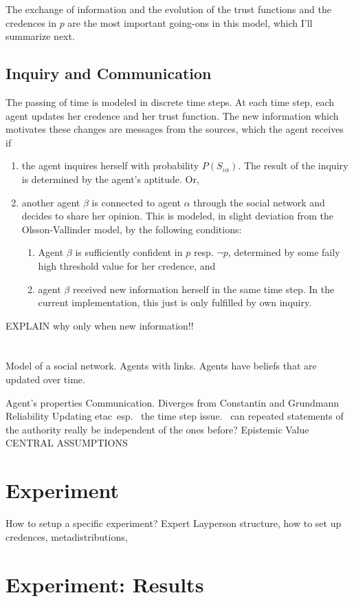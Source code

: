 \documentclass[11pt, a4paper]{article}
\begin{document}
The exchange of information and the evolution of the trust functions and the credences in $p$ are the most important going-ons in this model, which I'll summarize next.

\subsection{Inquiry and Communication} 
The passing of time is modeled in discrete time steps. At each time step, each agent updates her credence and her trust function. The new information which motivates these changes are messages from the sources, which the agent receives if
\begin{enumerate}[label = (\roman*)]
    \item the agent inquires herself with probability $P(S_{\iota\alpha})$. The result of the inquiry is determined by the agent's aptitude. Or,
    \item another agent $\beta$ is connected to agent $\alpha$ through the social network and decides to share her opinion. This is modeled, in slight deviation from the Olsson-Vallinder model, by the following conditions: 
        \begin{enumerate}[label = (\alph*)]
            \item Agent $\beta$ is sufficiently confident in $p$ resp. $\neg p$, determined by some faily high threshold value for her credence, and
            \item agent $\beta$ received new information herself in the same time step. In the current implementation, this just is only fulfilled by own inquiry.  
        \end{enumerate}
\end{enumerate}

EXPLAIN why only when new information!!

\section{}

Model of a social network. Agents with links. Agents have beliefs that are updated over time.

Agent's properties
Communication. Diverges from Constantin and Grundmann
Reliability
Updating etac\
esp. \ the time step issue. \ can repeated statements of the authority really be independent of the ones before?
Epistemic Value
CENTRAL ASSUMPTIONS

\section{Experiment}
How to setup a specific experiment? Expert Layperson structure, how to set up credences, metadistributions, 

\section{Experiment: Results}

\nocite{*}
\printbibliography{}
\end{document}
